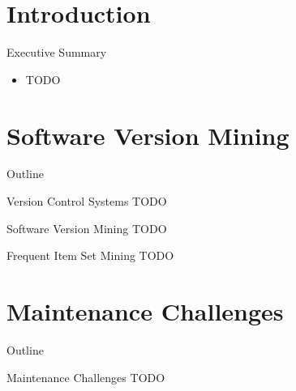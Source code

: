 \section*{Introduction}

\begin{frame}{Executive Summary}
  \begin{itemize}
  \item TODO
  \end{itemize}
\end{frame}



\section{Software Version Mining}


\begin{frame}{Outline}
  \tableofcontents[current]
\end{frame}


\begin{frame}{Version Control Systems}
  TODO
\end{frame}


\begin{frame}{Software Version Mining}
  TODO
\end{frame}


\begin{frame}{Frequent Item Set Mining}
  TODO
\end{frame}



\section{Maintenance Challenges}

\begin{frame}{Outline}
  \tableofcontents[current]
\end{frame}


\begin{frame}{Maintenance Challenges}
  TODO
\end{frame}

